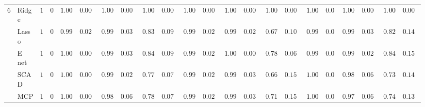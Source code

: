 \begin{tabular}{p{0.2cm}p{1cm}|p{0.6cm}p{0.6cm}|p{0.6cm}p{0.6cm}p{0.6cm}p{0.6cm}p{0.6cm}p{0.6cm}|p{0.6cm}p{0.6cm}p{0.6cm}p{0.6cm}p{0.6cm}p{0.6cm}|p{0.6cm}p{0.6cm}p{0.6cm}p{0.6cm}p{0.6cm}p{0.6cm}}
6 & Ridge  & $1$ & $0$ & $1.000$ & $0.0000$ & $1.000$ & $0.0000$ & $1.000$ & $0.0000$ & $1.000$ & $0.0000$ & $1.000$ & $0.0000$ & $1.000$ & $0.0000$ & $1.000$ & $0.00$ & $1.000$ & $0.0000$ & $1.000$ & $0.0000$ \\
 & Lasso  & $1$ & $0$ & $0.998$ & $0.0200$ & $0.994$ & $0.0343$ & $0.836$ & $0.0916$ & $0.998$ & $0.0200$ & $0.998$ & $0.0200$ & $0.670$ & $0.1000$ & $0.998$ & $0.02$ & $0.994$ & $0.0343$ & $0.826$ & $0.1440$ \\
 & E-net  & $1$ & $0$ & $1.000$ & $0.0000$ & $0.994$ & $0.0343$ & $0.844$ & $0.0925$ & $0.998$ & $0.0200$ & $1.000$ & $0.0000$ & $0.784$ & $0.0615$ & $0.998$ & $0.02$ & $0.998$ & $0.0200$ & $0.842$ & $0.1512$ \\
 & SCAD  & $1$ & $0$ & $1.000$ & $0.0000$ & $0.996$ & $0.0281$ & $0.774$ & $0.0787$ & $0.996$ & $0.0281$ & $0.994$ & $0.0343$ & $0.664$ & $0.1580$ & $1.000$ & $0.00$ & $0.980$ & $0.0603$ & $0.730$ & $0.1403$ \\
 & MCP  & $1$ & $0$ & $1.000$ & $0.0000$ & $0.980$ & $0.0603$ & $0.786$ & $0.0711$ & $0.996$ & $0.0281$ & $0.994$ & $0.0343$ & $0.714$ & $0.1511$ & $1.000$ & $0.00$ & $0.976$ & $0.0653$ & $0.746$ & $0.1359$ \\
\hline 
\end{tabular}

